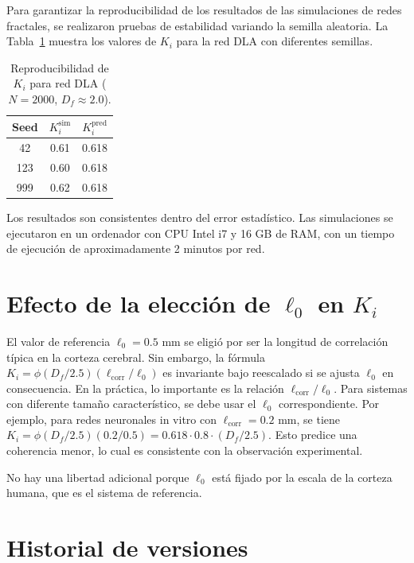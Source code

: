\documentclass[12pt, a4paper]{article}
\theoremstyle{miuThm}
\theoremstyle{remark}
\begin{document}
Para garantizar la reproducibilidad de los resultados de las simulaciones de redes fractales, se realizaron pruebas de estabilidad variando la semilla aleatoria. La Tabla~\ref{tab:validacion} muestra los valores de $K_i$ para la red DLA con diferentes semillas.

\begin{table}[h!]
\centering
\caption{Reproducibilidad de $K_i$ para red DLA ($N=2000$, $D_f\approx2.0$).}
\label{tab:validacion}
\begin{tabular}{ccc}
\toprule
\textbf{Seed} & $K_i^{\text{sim}}$ & $K_i^{\text{pred}}$ \\
\midrule
42 & 0.61 & 0.618 \\
123 & 0.60 & 0.618 \\
999 & 0.62 & 0.618 \\
\bottomrule
\end{tabular}
\end{table}

Los resultados son consistentes dentro del error estadístico. Las simulaciones se ejecutaron en un ordenador con CPU Intel i7 y 16 GB de RAM, con un tiempo de ejecución de aproximadamente 2 minutos por red.

\clearpage
\section{Efecto de la elección de $\ell_0$ en $K_i$}

El valor de referencia $\ell_0 = 0.5$ mm se eligió por ser la longitud de correlación típica en la corteza cerebral. Sin embargo, la fórmula $K_i = \phi (D_f/2.5)(\ell_{\text{corr}}/\ell_0)$ es invariante bajo reescalado si se ajusta $\ell_0$ en consecuencia. En la práctica, lo importante es la relación $\ell_{\text{corr}}/\ell_0$. Para sistemas con diferente tamaño característico, se debe usar el $\ell_0$ correspondiente. Por ejemplo, para redes neuronales in vitro con $\ell_{\text{corr}} = 0.2$ mm, se tiene $K_i = \phi (D_f/2.5)(0.2/0.5) = 0.618 \cdot 0.8 \cdot (D_f/2.5)$. Esto predice una coherencia menor, lo cual es consistente con la observación experimental.

No hay una libertad adicional porque $\ell_0$ está fijado por la escala de la corteza humana, que es el sistema de referencia.

\clearpage
\section{Historial de versiones}
\end{document}
